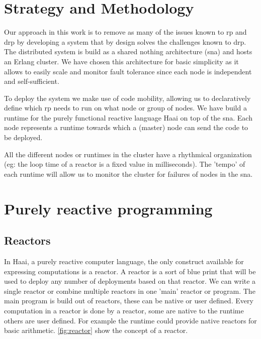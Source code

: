 \documentclass[a4paper]{book}
\begin{document}
\chapter{Strategy and Methodology}

Our approach in this work is to remove as many of the issues known to rp and drp by developing a system that by design solves the challenges known to drp. The distributed system is build as a shared nothing architecture (sna) and hosts an Erlang cluster. We have chosen this architecture for basic simplicity as it allows to easily scale and monitor fault tolerance since each node is independent and self-sufficient.

To deploy the system we make use of code mobility, allowing us to declaratively define which rp needs to run on what node or group of nodes. We have build a runtime for the purely functional reactive language Haai on top of the sna. Each node represents a runtime towards which a (master) node can send the code to be deployed.

All the different nodes or runtimes in the cluster have a rhythmical organization (eg: the loop time of a reactor is a fixed value in milliseconds). The 'tempo' of each runtime will allow us to monitor the cluster for failures of nodes in the sna.  

\chapter{Purely reactive programming} \label{sec:prp}
\section{Reactors}
In Haai, a purely reactive computer language, the only construct available for expressing computations is a reactor. A reactor is a sort of blue print that will be used to deploy any number of deployments based on that reactor. We can write a single reactor or combine multiple reactors in one 'main' reactor or program. The main program is build out of reactors, these can be native or user defined. Every computation in a reactor is done by a reactor, some are native to the runtime others are user defined. For example the runtime could provide native reactors for basic arithmetic. \ref{fig:reactor} show the concept of a reactor.
\end{document}
